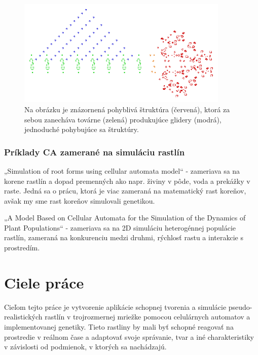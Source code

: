 \documentclass[12pt]{article}
\begin{document}
\begin{figure}[ht]
	\centering
	\includegraphics[width=0.9\textwidth]{res/Conways_game_of_life_breeder.png}
	\caption{Na obrázku je znázornená pohyblivá štruktúra (červená), ktorá
		za sebou zanecháva továrne (zelená) produkujúce glidery (modrá),
		jednoduché pohybujúce sa štruktúry.}
	\label{obr:conwayova hra zivota}
\end{figure}

\subsubsection{Príklady CA zamerané na simuláciu rastlín}

„Simulation of root forms using cellular automata model“ - zameriava sa na
korene rastlín a dopad premenných ako napr. živiny v pôde, voda a prekážky
v raste. Jedná sa o prácu, ktorá je viac zameraná na matematický rast koreňov,
avšak my sme rast koreňov simulovali genetikou.

„A Model Based on Cellular Automata for the Simulation of the Dynamics of
Plant Populations“ - zameriava sa na 2D simuláciu heterogénnej populácie
rastlín, zameraná na konkurenciu medzi druhmi, rýchlosť rastu a interakcie
s prostredím.

\section{Ciele práce}

Cieľom tejto práce je vytvorenie aplikácie schopnej tvorenia a simulácie
pseudo-rea\-listických rastlín v trojrozmernej mriežke pomocou celulárnych
automatov a implementovanej genetiky.
Tieto rastliny by mali byť schopné reagovať na prostredie v reálnom čase
a adaptovať svoje správanie, tvar a iné charakteristiky v závislosti
od podmienok, v ktorých sa nachádzajú.
\end{document}
